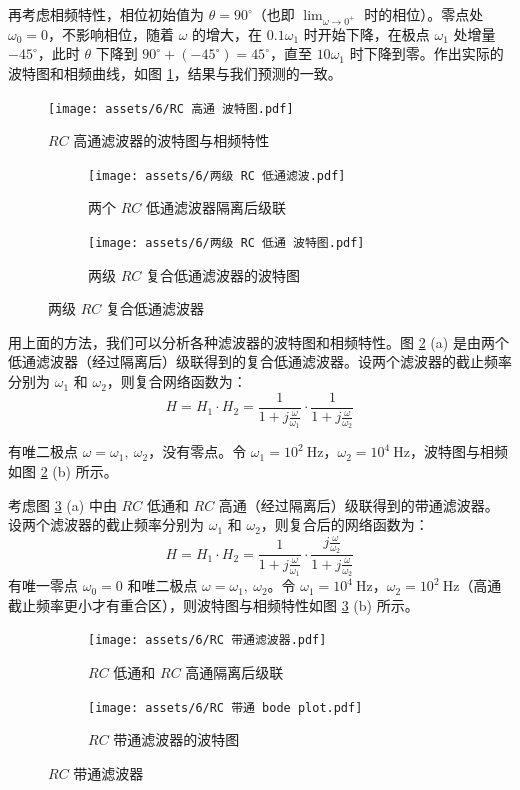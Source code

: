\documentclass[UTF8]{report}
\def\Hz{\ \mathrm{Hz}}
\theoremstyle{MyLineTheoremStyle} %
\theoremstyle{MyBlockTheoremStyle} %
\theoremstyle{MySubsubsectionStyle} %
\begin{document}
再考虑相频特性，相位初始值为 $\theta = 90^{\circ}$（也即 $\lim_{\omega \to 0^+}$ 时的相位）。零点处 $\omega_0 = 0$，不影响相位，随着 $\omega$ 的增大，在 $0.1 \omega_1$ 时开始下降，在极点 $\omega_1$ 处增量 $-45^{\circ}$，此时 $\theta$ 下降到 $90^\circ + (-45^\circ) = 45^\circ$，直至 $10\omega_1$ 时下降到零。作出实际的波特图和相频曲线，如图 \ref{$RC$ 高通滤波器的波特图}，结果与我们预测的一致。
\begin{figure}[H]\centering
    \texttt{[image: assets/6/RC 高通 波特图.pdf]}
    \caption{$RC$ 高通滤波器的波特图与相频特性}
    \label{$RC$ 高通滤波器的波特图}
\end{figure}


\begin{figure}[H]\centering
\begin{subfigure}[b]{0.55\columnwidth}\centering
    \texttt{[image: assets/6/两级 RC 低通滤波.pdf]}
    \caption{两个 $RC$ 低通滤波器隔离后级联}
\end{subfigure}\hfill
\begin{subfigure}[b]{0.45\columnwidth}\centering
    \texttt{[image: assets/6/两级 RC 低通 波特图.pdf]}
    \caption{两级 $RC$ 复合低通滤波器的波特图}
\end{subfigure}
\caption{两级 $RC$ 复合低通滤波器}
\label{两级 RC 低通滤波器}
\end{figure}
用上面的方法，我们可以分析各种滤波器的波特图和相频特性。图 \ref{两级 RC 低通滤波器} (a) 是由两个低通滤波器（经过隔离后）级联得到的复合低通滤波器。设两个滤波器的截止频率分别为 $\omega_1$ 和 $\omega_2$，则复合网络函数为：
\begin{equation}
H = H_1 \cdot H_2 = \frac{1}{1 + j \frac{\omega}{\omega_1} } \cdot \frac{1}{1 + j \frac{\omega}{\omega_2} }
\end{equation}

有唯二极点 $\omega = \omega_1,\ \omega_2$，没有零点。令 $\omega_1 = 10^2 \Hz$，$\omega_2 = 10^4 \Hz$，波特图与相频如图 \ref{两级 RC 低通滤波器} (b) 所示。




考虑图 \ref{RC 带通滤波器} (a) 中由 $RC$ 低通和 $RC$ 高通（经过隔离后）级联得到的带通滤波器。设两个滤波器的截止频率分别为 $\omega_1$ 和 $\omega_2$，则复合后的网络函数为：
\begin{equation}
H = H_1 \cdot H_2 = \frac{1}{1 + j \frac{\omega}{\omega_1} } \cdot \frac{j \frac{\omega}{\omega_2} }{1 + j \frac{\omega}{\omega_2} }
\end{equation}
有唯一零点 $\omega_0 = 0$ 和唯二极点 $\omega = \omega_1, \ \omega_2$。令 $\omega_1 = 10^4 \Hz$，$\omega_2 = 10^2 \Hz$（高通截止频率更小才有重合区），则波特图与相频特性如图 \ref{RC 带通滤波器} (b) 所示。
\begin{figure}[H]\centering
\begin{subfigure}[b]{0.5\columnwidth}\centering
    \texttt{[image: assets/6/RC 带通滤波器.pdf]}
    \caption{$RC$ 低通和 $RC$ 高通隔离后级联}
\end{subfigure}\hfill
\begin{subfigure}[b]{0.5\columnwidth}\centering
    \texttt{[image: assets/6/RC 带通 bode plot.pdf]}
    \caption{$RC$ 带通滤波器的波特图}
\end{subfigure}
\caption{$RC$ 带通滤波器}
\label{RC 带通滤波器}
\end{figure}
\end{document}
